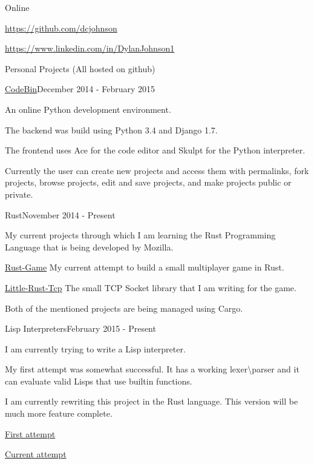 \documentclass{resume} %
\begin{document}
\clearpage

\begin{rSection}{Online}

	\item {\href{https://github.com/dcjohnson}{https://github.com/dcjohnson}}
	\item {\href{https://www.linkedin.com/in/DylanJohnson1}{https://www.linkedin.com/in/DylanJohnson1}}
\end{rSection}

\begin{rSection}{Personal Projects (All hosted on github)}

\begin{rSubsection}{\href{https://github.com/dcjohnson/CodeBin}{CodeBin}}{December 2014 - February 2015}{}{}
	\item An online Python development environment.
	\item The backend was build using Python 3.4 and Django 1.7.
	\item The frontend uses Ace for the code editor and Skulpt for the Python interpreter.
	\item Currently the user can create new projects and access them with permalinks, fork projects, browse projects, edit and save projects, and make projects public or private.
\end{rSubsection}

\begin{rSubsection}{Rust}{November 2014 - Present}{}{}
	\item My current projects through which I am learning the Rust Programming Language that is being developed by Mozilla.
	\item {\href{https://github.com/dcjohnson/Rust-Game}{Rust-Game}} My current attempt to build a small multiplayer game in Rust.
	\item {\href{https://github.com/dcjohnson/Little-Rust-Tcp}{Little-Rust-Tcp}} The small TCP Socket library that I am writing for the game.
	\item Both of the mentioned projects are being managed using Cargo.
\end{rSubsection}

\begin{rSubsection}{Lisp Interpreters}{February 2015 - Present}{}{}
	\item I am currently trying to write a Lisp interpreter.
	\item My first attempt was somewhat successful.  It has a working lexer\textbackslash parser and it can evaluate valid Lisps that use builtin functions.
	\item I am currently rewriting this project in the Rust language.  This version will be much more feature complete.
	\item {\href{https://github.com/dcjohnson/hackit}{First attempt}}
	\item {\href{https://github.com/dcjohnson/Hackit-v2}{Current attempt}}
\end{rSubsection}

\end{rSection}
\end{document}
